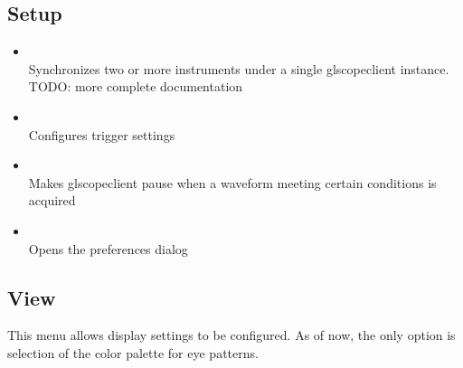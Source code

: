 \subsection{Setup}

\begin{itemize}

\item {}\\
Synchronizes two or more instruments under a single glscopeclient instance. TODO: more complete documentation

\item {}\\
Configures trigger settings

\item {}\\
Makes glscopeclient pause when a waveform meeting certain conditions is acquired

\item {}\\
Opens the preferences dialog

\end{itemize}

\subsection{View}

This menu allows display settings to be configured. As of now, the only option is selection of the color palette for
eye patterns.

